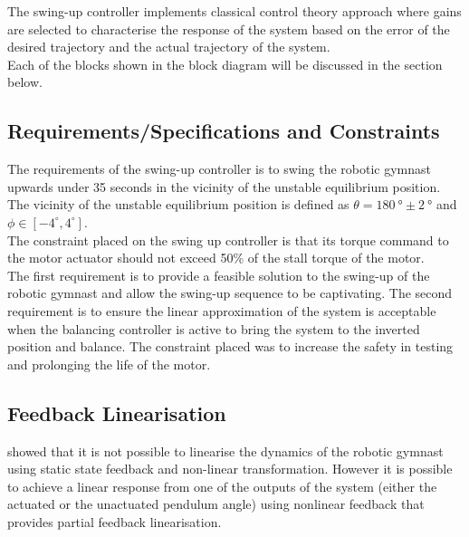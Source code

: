 The swing-up controller implements classical control theory approach where gains are selected to characterise the response of the system based on the error of the desired trajectory and the actual trajectory of the system.\\

Each of the blocks shown in the block diagram will be discussed in the section below.


\subsection{Requirements/Specifications and Constraints}
The requirements of the swing-up controller is to swing the robotic gymnast upwards under 35 seconds in the vicinity of the unstable equilibrium position. The vicinity of the unstable equilibrium position is defined as $\theta = \SI{180}{\degree} \pm \SI{2}{\degree}$ and $\phi \in [-4^{\circ},4^{\circ}]$.\\

The constraint placed on the swing up controller is that its torque command to the motor actuator should not exceed 50\% of the stall torque of the motor.\\


The first requirement is to provide a feasible solution to the swing-up of the robotic gymnast and allow the swing-up sequence to be captivating. The second requirement is to ensure the linear approximation of the system is acceptable when the balancing controller is active to bring the system to the inverted position and balance. The constraint placed was to increase the safety in testing and prolonging the life of the motor.\\

\subsection{Feedback Linearisation}
\label{sec:feedback_linearisation}
\citet{murray} showed that it is not possible to linearise the dynamics of the robotic gymnast using static state feedback and non-linear transformation. However it is possible to achieve a linear response from one of the outputs of the system (either the actuated or the unactuated pendulum angle) using nonlinear feedback that provides partial feedback linearisation.\\

